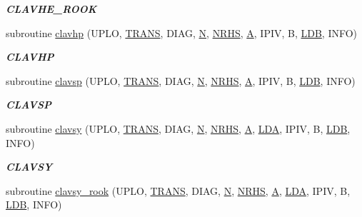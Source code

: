 \begin{DoxyCompactItemize}
\begin{DoxyCompactList}\small\item\em {\bfseries C\+L\+A\+V\+H\+E\+\_\+\+R\+O\+O\+K} \end{DoxyCompactList}\item 
subroutine \hyperlink{group__complex__lin_ga5a3e8f91ca2de440a6b801734d99c4df}{clavhp} (U\+P\+L\+O, \hyperlink{superlu__enum__consts_8h_a0c4e17b2d5cea33f9991ccc6a6678d62a1f61e3015bfe0f0c2c3fda4c5a0cdf58}{T\+R\+A\+N\+S}, D\+I\+A\+G, \hyperlink{polmisc_8c_a0240ac851181b84ac374872dc5434ee4}{N}, \hyperlink{example__user_8c_aa0138da002ce2a90360df2f521eb3198}{N\+R\+H\+S}, \hyperlink{classA}{A}, I\+P\+I\+V, B, \hyperlink{example__user_8c_a50e90a7104df172b5a89a06c47fcca04}{L\+D\+B}, I\+N\+F\+O)
\begin{DoxyCompactList}\small\item\em {\bfseries C\+L\+A\+V\+H\+P} \end{DoxyCompactList}\item 
subroutine \hyperlink{group__complex__lin_gaa9a07089f332e6058c3d983e7e737879}{clavsp} (U\+P\+L\+O, \hyperlink{superlu__enum__consts_8h_a0c4e17b2d5cea33f9991ccc6a6678d62a1f61e3015bfe0f0c2c3fda4c5a0cdf58}{T\+R\+A\+N\+S}, D\+I\+A\+G, \hyperlink{polmisc_8c_a0240ac851181b84ac374872dc5434ee4}{N}, \hyperlink{example__user_8c_aa0138da002ce2a90360df2f521eb3198}{N\+R\+H\+S}, \hyperlink{classA}{A}, I\+P\+I\+V, B, \hyperlink{example__user_8c_a50e90a7104df172b5a89a06c47fcca04}{L\+D\+B}, I\+N\+F\+O)
\begin{DoxyCompactList}\small\item\em {\bfseries C\+L\+A\+V\+S\+P} \end{DoxyCompactList}\item 
subroutine \hyperlink{group__complex__lin_gafa9175f598ca22a02c8cf24fcf034ede}{clavsy} (U\+P\+L\+O, \hyperlink{superlu__enum__consts_8h_a0c4e17b2d5cea33f9991ccc6a6678d62a1f61e3015bfe0f0c2c3fda4c5a0cdf58}{T\+R\+A\+N\+S}, D\+I\+A\+G, \hyperlink{polmisc_8c_a0240ac851181b84ac374872dc5434ee4}{N}, \hyperlink{example__user_8c_aa0138da002ce2a90360df2f521eb3198}{N\+R\+H\+S}, \hyperlink{classA}{A}, \hyperlink{example__user_8c_ae946da542ce0db94dced19b2ecefd1aa}{L\+D\+A}, I\+P\+I\+V, B, \hyperlink{example__user_8c_a50e90a7104df172b5a89a06c47fcca04}{L\+D\+B}, I\+N\+F\+O)
\begin{DoxyCompactList}\small\item\em {\bfseries C\+L\+A\+V\+S\+Y} \end{DoxyCompactList}\item 
subroutine \hyperlink{group__complex__lin_gae46d9dedb0aca0232bb8d447684afb06}{clavsy\+\_\+rook} (U\+P\+L\+O, \hyperlink{superlu__enum__consts_8h_a0c4e17b2d5cea33f9991ccc6a6678d62a1f61e3015bfe0f0c2c3fda4c5a0cdf58}{T\+R\+A\+N\+S}, D\+I\+A\+G, \hyperlink{polmisc_8c_a0240ac851181b84ac374872dc5434ee4}{N}, \hyperlink{example__user_8c_aa0138da002ce2a90360df2f521eb3198}{N\+R\+H\+S}, \hyperlink{classA}{A}, \hyperlink{example__user_8c_ae946da542ce0db94dced19b2ecefd1aa}{L\+D\+A}, I\+P\+I\+V, B, \hyperlink{example__user_8c_a50e90a7104df172b5a89a06c47fcca04}{L\+D\+B}, I\+N\+F\+O)

\end{DoxyCompactItemize}

